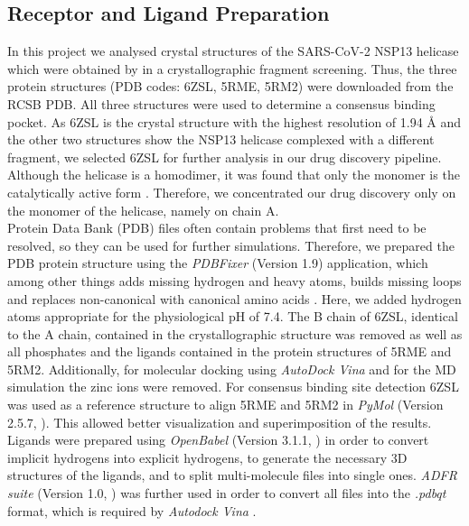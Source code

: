 \documentclass[11pt, letterpaper, titlepage]{article}
\renewcommand{\cite}{\parencite}
\begin{document}
\subsection{Receptor and Ligand Preparation}
In this project we analysed crystal structures of the \ac{SARS-CoV-2} \ac{NSP13} helicase which were obtained by \cite{NSP13_basics} in a crystallographic fragment screening. Thus, the three protein structures (PDB codes: 6ZSL, 5RME, 5RM2) were downloaded from the \ac{RCSB PDB}. All three structures were used to determine a consensus binding pocket. As 6ZSL is the crystal structure with the highest resolution of 1.94 {\AA} and the other two structures show the \ac{NSP13} helicase complexed with a different fragment, we selected 6ZSL for further analysis in our drug discovery pipeline. Although the helicase is a homodimer, it was found that only the monomer is the catalytically active form \cite{Berta_2021}. Therefore, we concentrated our drug discovery only on the monomer of the helicase, namely on chain A. \\
Protein Data Bank (PDB) files often contain problems that first need to be resolved, so they can be used for further simulations. Therefore, we prepared the PDB protein structure using the \textit{PDBFixer} (Version 1.9) application, which among other things adds missing hydrogen and heavy atoms, builds missing loops and replaces non-canonical with canonical amino acids \cite{Eastman_2017}. Here, we added hydrogen atoms appropriate for the physiological pH of 7.4. The B chain of 6ZSL, identical to the A chain, contained in the crystallographic structure was removed as well as all phosphates and the ligands contained in the protein structures of 5RME and 5RM2. Additionally, for molecular docking using \textit{AutoDock Vina} %
and for the \ac{MD} simulation the zinc ions were removed. For consensus binding site detection 6ZSL was used as a reference structure to align 5RME and 5RM2 in \textit{PyMol} (Version 2.5.7, \textcite{PyMol_endnote}). This allowed better visualization and superimposition of the results.\\ 
Ligands were prepared using \textit{OpenBabel} (Version 3.1.1, \textcite{OpenBabel}) in order to convert implicit hydrogens into explicit hydrogens, to generate the necessary 3D structures of the ligands, and to split multi-molecule files into single ones. \textit{ADFR suite} (Version 1.0, \textcite{AutoDockFR}) was further used in order to convert all files into the \textit{.pdbqt} format, which is required by \textit{Autodock Vina} \cite{Trott.2010}. 
\end{document}
